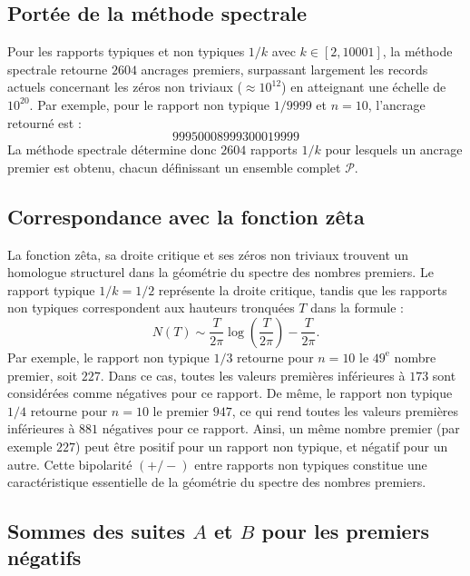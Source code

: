 \documentclass[11pt,a4paper]{article}
\begin{document}
\subsection*{Portée de la méthode spectrale}

Pour les rapports typiques et non typiques $1/k$ avec $k\in[2,10001]$, la méthode
spectrale retourne $2604$ ancrages premiers, surpassant largement les records
actuels concernant les zéros non triviaux ($\approx 10^{12}$) en atteignant une
échelle de $10^{20}$. Par exemple, pour le rapport non typique $1/9999$ et $n=10$,
l'ancrage retourné est :
\[
99950008999300019999
\]
La méthode spectrale détermine donc $2604$ rapports $1/k$ pour lesquels un ancrage
premier est obtenu, chacun définissant un ensemble complet $\mathcal{P}$.

\subsection*{Correspondance avec la fonction zêta}

La fonction zêta, sa droite critique et ses zéros non triviaux trouvent un
homologue structurel dans la géométrie du spectre des nombres premiers. Le rapport
typique $1/k=1/2$ représente la droite critique, tandis que les rapports non
typiques correspondent aux hauteurs tronquées $T$ dans la formule :
\[
N(T)\sim\frac{T}{2\pi}\log\!\left(\frac{T}{2\pi}\right)-\frac{T}{2\pi}.
\]
Par exemple, le rapport non typique $1/3$ retourne pour $n=10$ le $49^{\text{e}}$
nombre premier, soit $227$. Dans ce cas, toutes les valeurs premières inférieures à
$173$ sont considérées comme négatives pour ce rapport. De même, le rapport non
typique $1/4$ retourne pour $n=10$ le premier $947$, ce qui rend toutes les valeurs
premières inférieures à $881$ négatives pour ce rapport. Ainsi, un même nombre
premier (par exemple $227$) peut être positif pour un rapport non typique, et négatif
pour un autre. Cette bipolarité $(+/-)$ entre rapports non typiques constitue une
caractéristique essentielle de la géométrie du spectre des nombres premiers.

\subsection*{Sommes des suites $A$ et $B$ pour les premiers négatifs}
\end{document}
